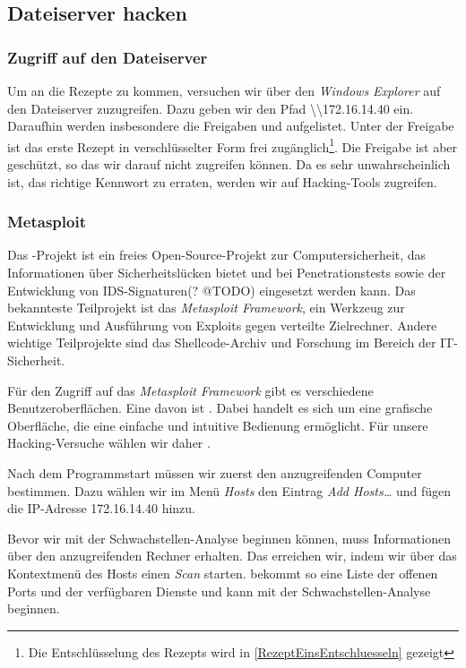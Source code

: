 \subsection{Dateiserver hacken}
\label{sec:dateiserverhacken}


\subsubsection{Zugriff auf den Dateiserver}

Um an die Rezepte zu kommen, versuchen wir über den \emph{Windows Explorer} auf den Dateiserver zuzugreifen.
Dazu geben wir den Pfad \textbackslash\textbackslash172.16.14.40 ein. Daraufhin werden insbesondere die Freigaben  und  aufgelistet. Unter der Freigabe  ist das erste Rezept in verschlüsselter Form frei zugänglich\footnote{Die Entschlüsselung
  des Rezepts wird in \cref{RezeptEinsEntschluesseln} gezeigt}. Die Freigabe  ist aber geschützt, so das wir darauf nicht zugreifen können. Da es sehr unwahrscheinlich ist, das richtige Kennwort zu erraten, werden wir auf Hacking-Tools zugreifen.

\subsubsection{Metasploit}

Das \Metasploit{}-Projekt ist ein freies Open-Source-Projekt zur
Computersicherheit, das Informationen über Sicherheitslücken bietet und bei
Penetrationstests sowie der Entwicklung von IDS-Signaturen(? @TODO) eingesetzt
werden kann. Das bekannteste Teilprojekt ist das \emph{Metasploit Framework}, ein
Werkzeug zur Entwicklung und Ausführung von Exploits gegen verteilte
Zielrechner. Andere wichtige Teilprojekte sind das Shellcode-Archiv und
Forschung im Bereich der IT-Sicherheit.

Für den Zugriff auf das \emph{Metasploit Framework} gibt es verschiedene Benutzeroberflächen. 
Eine davon ist \Armitage{}. Dabei handelt es sich um eine grafische Oberfläche, die eine einfache 
und intuitive Bedienung ermöglicht. Für unsere Hacking-Versuche wählen wir daher \Armitage.

Nach dem Programmstart müssen wir zuerst den anzugreifenden Computer bestimmen. Dazu wählen wir im Menü \emph{Hosts} 
den Eintrag \emph{\glqq{}Add Hosts\ldots{}\grqq{}} und fügen die IP-Adresse 172.16.14.40 hinzu.

Bevor wir mit der Schwachstellen-Analyse beginnen können, muss \Armitage{} Informationen über den anzugreifenden Rechner erhalten. Das erreichen wir, indem wir über das Kontextmenü des Hosts einen \emph{Scan} starten. \Armitage{} bekommt so eine Liste der offenen Ports und der verfügbaren Dienste und kann mit der Schwachstellen-Analyse beginnen.

